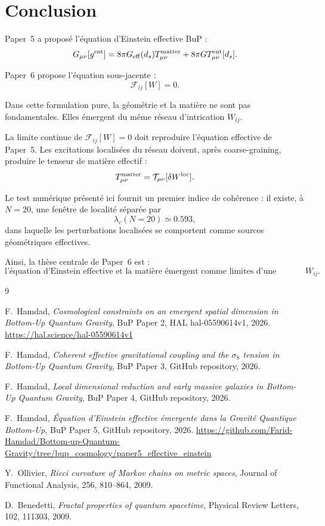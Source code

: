 \documentclass[11pt,a4paper]{article}
\begin{document}
\section{Conclusion}
\label{sec:conclusion}

Paper~5 a proposé l'équation d'Einstein effective BuP :
\[
G_{\mu\nu}[g^{\rm ent}]
=
8\pi G_{\rm eff}(d_s)T_{\mu\nu}^{\rm matter}
+
8\pi G T_{\mu\nu}^{\rm ent}[d_s].
\]

Paper~6 propose l'équation sous-jacente :
\[
\boxed{
\mathcal{F}_{ij}[W]=0.
}
\]

Dans cette formulation pure, la géométrie et la matière ne sont pas fondamentales. Elles émergent du même réseau d'intrication \(W_{ij}\).

La limite continue de \(\mathcal{F}_{ij}[W]=0\) doit reproduire l'équation effective de Paper~5. Les excitations localisées du réseau doivent, après coarse-graining, produire le tenseur de matière effectif :
\[
T_{\mu\nu}^{\rm matter}
=
\mathcal{T}_{\mu\nu}[\delta W^{\rm loc}].
\]

Le test numérique présenté ici fournit un premier indice de cohérence : il existe, à \(N=20\), une fenêtre de localité séparée par
\[
\lambda_c(N=20)\simeq0.593,
\]
dans laquelle les perturbations localisées se comportent comme sources géométriques effectives.

Ainsi, la thèse centrale de Paper~6 est :
\[
\boxed{
\text{l'équation d'Einstein effective et la matière émergent comme limites d'une équation pure sur } W_{ij}.
}
\]

\begin{thebibliography}{9}

F.~Hamdad,
\textit{Cosmological constraints on an emergent spatial dimension in Bottom-Up Quantum Gravity},
BuP Paper 2, HAL hal-05590614v1, 2026.
\url{https://hal.science/hal-05590614v1}

F.~Hamdad,
\textit{Coherent effective gravitational coupling and the \(\sigma_8\) tension in Bottom-Up Quantum Gravity},
BuP Paper 3, GitHub repository, 2026.

F.~Hamdad,
\textit{Local dimensional reduction and early massive galaxies in Bottom-Up Quantum Gravity},
BuP Paper 4, GitHub repository, 2026.

F.~Hamdad,
\textit{Équation d'Einstein effective émergente dans la Gravité Quantique Bottom-Up},
BuP Paper 5, GitHub repository, 2026.
\url{https://github.com/Farid-Hamdad/Bottom-up-Quantum-Gravity/tree/bup_cosmology/paper5_effective_einstein}

Y.~Ollivier,
\textit{Ricci curvature of Markov chains on metric spaces},
Journal of Functional Analysis, 256, 810--864, 2009.

D.~Benedetti,
\textit{Fractal properties of quantum spacetime},
Physical Review Letters, 102, 111303, 2009.

\end{thebibliography}
\end{document}
